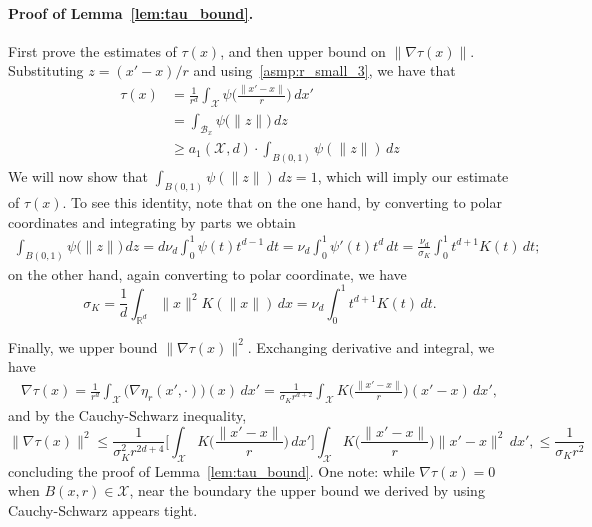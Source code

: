 \documentclass{article}
\newcommand{\Reals}{\mathbb{R}}
\newcommand{\1}{\mathbf{1}}
\newcommand{\Xset}{\mathcal{X}}
\newcommand{\mc}[1]{\mathcal{#1}}
\theoremstyle{alden}
\theoremstyle{aldenthm}
\theoremstyle{definition}
\theoremstyle{remark}
\begin{document}
\paragraph{Proof of Lemma~\ref{lem:tau_bound}.}
First prove the estimates of $\tau(x)$, and then upper bound on $\|\nabla\tau(x)\|$. Substituting $z = (x' - x)/r$ and using~\ref{asmp:r_small_3}, we have that
\begin{align*}
\tau(x) & = \frac{1}{r^d} \int_{\Xset} \psi\biggl(\frac{\|x' - x\|}{r}\biggr) \,dx' \\
& =  \int_{\mc{B}_x} \psi\bigl(\|z\|\bigr) \,dz \\
& \geq a_1(\Xset,d) \cdot \int_{B(0,1)} \psi(\|z\|) \,dz
\end{align*}
We will now show that $\int_{B(0,1)} \psi(\|z\|) \,dz = 1$, which will imply our estimate of $\tau(x)$. To see this identity, note that on the one hand, by converting to polar coordinates and integrating by parts we obtain
\begin{align*}
\int_{B(0,1)} \psi\bigl(\|z\|\bigr) \,dz = d \nu_d \int_{0}^{1} \psi(t) t^{d - 1} \,dt = \nu_d \int_{0}^{1} \psi'(t) t^{d} \,dt = \frac{\nu_d}{\sigma_K} \int_{0}^{1} t^{d + 1} K(t) \,dt;
\end{align*}
on the other hand, again converting to polar coordinate, we have
\begin{equation*}
\sigma_K = \frac{1}{d} \int_{\Reals^d} \|x\|^2 K(\|x\|) \,dx = \nu_d \int_{0}^{1}t^{d + 1} K(t) \,dt.
\end{equation*}

Finally, we upper bound $\|\nabla\tau(x)\|^2$. Exchanging derivative and integral, we have
\begin{align*}
\nabla\tau(x) = \frac{1}{r^d} \int_{\Xset} \bigl(\nabla \eta_r(x',\cdot)\bigr)(x) \,dx' = \frac{1}{\sigma_K r^{d + 2}} \int_{\Xset} K\biggl(\frac{\|x' - x\|}{r}\biggr)(x' - x)\,dx',
\end{align*}
and by the Cauchy-Schwarz inequality,
\begin{equation*}
\|\nabla\tau(x)\|^2 \leq \frac{1}{\sigma_K^2 r^{2d + 4}} \biggl[\int_{\Xset} K\biggl(\frac{\|x' - x\|}{r}\biggr)\,dx'\biggr] \int_{\Xset} K\biggl(\frac{\|x' - x\|}{r}\biggr)\|x' - x\|^2\,dx', \leq \frac{1}{\sigma_K r^{2}}
\end{equation*}
concluding the proof of Lemma~\ref{lem:tau_bound}. One note: while $\nabla\tau(x) = 0$ when $B(x,r) \in \Xset$, near the boundary the upper bound we derived by using Cauchy-Schwarz appears tight. 
\end{document}
